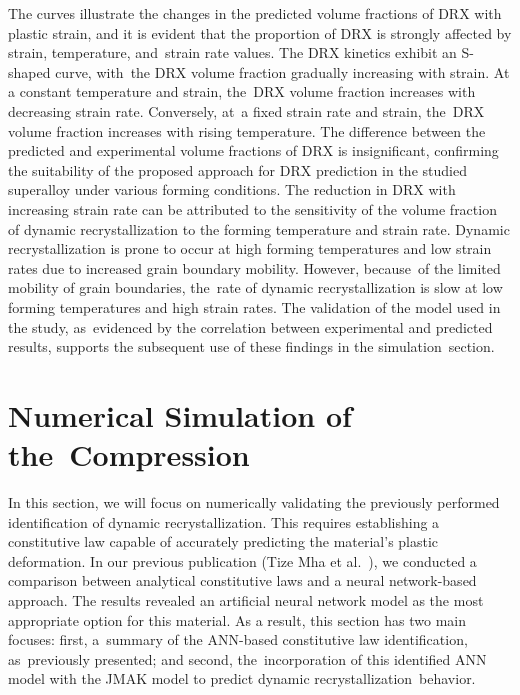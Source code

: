 \documentclass[metals,article,accept,pdftex,moreauthors]{Definitions/mdpi}
\makeatletter
\DeclareRobustCommand{\eal}{et al.\@\xspace}
\makeatother
\begin{document}
The curves illustrate the changes in the predicted volume fractions of DRX with plastic strain, and it is evident that the proportion of DRX is strongly affected by strain, temperature, and~strain rate values.
The DRX kinetics exhibit an S-shaped curve, with~the DRX volume fraction gradually increasing with strain.
At a constant temperature and strain, the~DRX volume fraction increases with decreasing strain rate.
Conversely, at~a fixed strain rate and strain, the~DRX volume fraction increases with rising temperature.
The difference between the predicted and experimental volume fractions of DRX is insignificant, confirming the suitability of the proposed approach for DRX prediction in the studied superalloy under various forming conditions.
The reduction in DRX with increasing strain rate can be attributed to the sensitivity of the volume fraction of dynamic recrystallization to the forming temperature and strain rate.
Dynamic recrystallization is prone to occur at high forming temperatures and low strain rates due to increased grain boundary mobility.
\linebreak However, because~of the limited mobility of grain boundaries, the~rate of dynamic recrystallization is slow at low forming temperatures and high strain rates.
The validation of the model used in the study, as~evidenced by the correlation between experimental and predicted results, supports the subsequent use of these findings in the simulation~section.

\section{Numerical Simulation of the~Compression}\label{sec:NumSim}
In this section, we will focus on numerically validating the previously performed identification of dynamic recrystallization.
This requires establishing a constitutive law capable of accurately predicting the material's plastic deformation.
In our previous publication (Tize Mha \eal~\cite{TizeMha-2023}), we conducted a comparison between analytical constitutive laws and a neural network-based approach.
The results revealed an artificial neural network model as the most appropriate option for this material.
As a result, this section has two main focuses: first, a~summary of the ANN-based constitutive law identification, as~previously presented; and second, the~incorporation of this identified ANN model with the JMAK model to predict dynamic recrystallization~behavior.
\end{document}
